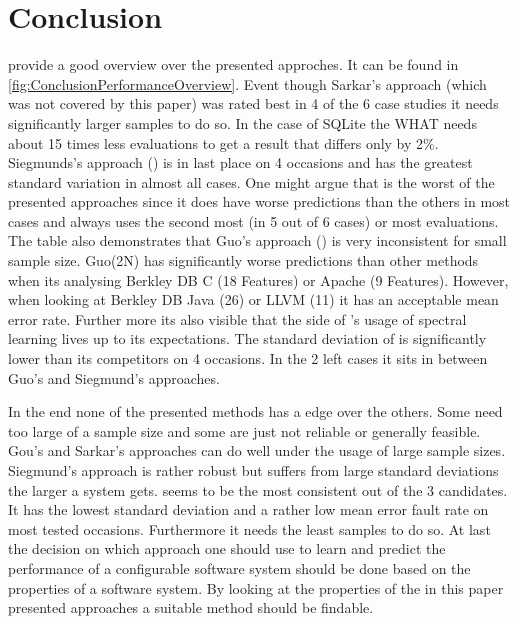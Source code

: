 \section{Conclusion}

\citet{FasterDiscoveryofFasterSystemConfigurationsSiegmund2017} provide a good overview over the presented approches. It can be found in \cref{fig:ConclusionPerformanceOverview}. 
Event though Sarkar's approach (which was not covered by this paper) was rated best in 4 of the 6 case studies it needs significantly larger samples to do so. In the case of SQLite the WHAT needs about 15 times less evaluations to get a result that differs only by 2\%.
Siegmunds's approach (\cite{AutomatedFeatureDetectionSiegmund2012}) is in last place on 4 occasions and has the greatest standard variation in almost all cases. One might argue that \AFID is the worst of the presented approaches since it does have worse predictions than the others in most cases and always uses the second most (in 5 out of 6 cases) or most evaluations.
The table also demonstrates that Guo's approach (\cite{VariabilityAwarePerformancePredictionJianmeiSigmundApel}) is very inconsistent for small sample size. Guo(2N) has significantly worse predictions than other methods when its analysing Berkley DB C (18 Features) or Apache (9 Features). However, when looking at Berkley DB Java (26) or LLVM (11) it has an acceptable mean error rate.
Further more its also visible that the side of \WHAT's usage of spectral learning lives up to its expectations. The standard deviation of \WHAT is significantly lower than its competitors on 4 occasions. In the 2 left cases it sits in between Guo's and Siegmund's approaches.

In the end none of the presented methods has a edge over the others. Some need too large of a sample size and some are just not reliable or generally feasible. Gou's and Sarkar's approaches can do well under the usage of large sample sizes. Siegmund's approach is rather robust but suffers from large standard deviations the larger a system gets. \WHAT seems to be the most consistent out of the 3 candidates. It has the lowest standard deviation and a rather low mean error fault rate on most tested occasions. Furthermore it needs the least samples to do so.
At last the decision on which approach one should use to learn and predict the performance of a configurable software system should be done based on the properties of a software system. By looking at the properties of the in this paper presented approaches a suitable method should be findable.


